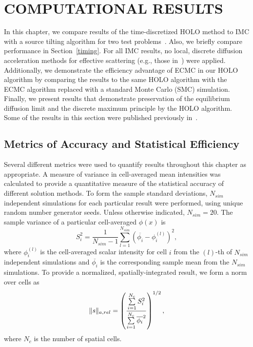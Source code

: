 
\chapter{\uppercase{Computational Results}}
\label{chp:results}

In this chapter, we compare results of the time-discretized HOLO method to IMC with
a source tilting algorithm for two test problems~\cite{jayenne}.  Also, we
briefly compare performance in Section~\ref{timing}.  For all IMC results, no
local, discrete diffusion acceleration methods for effective scattering
(e.g., those in~\cite{imd,ddmc}) were applied.  Additionally, we demonstrate
the efficiency advantage of ECMC in our HOLO algorithm by comparing the results
to the same HOLO algorithm with the ECMC algorithm replaced with a standard
Monte Carlo (SMC) simulation.  Finally, we present results that demonstrate
preservation of the equilibrium diffusion limit and the discrete maximum
principle by the HOLO algorithm.  Some of the results in this section were published
previously in~\cite{bolding_nse}.  

\section{Metrics of Accuracy and Statistical Efficiency}
\label{sec:metrics}

Several different metrics were used to quantify results throughout this chapter as
appropriate.
A measure of variance in cell-averaged mean intensities was
calculated to provide a quantitative measure of the statistical accuracy of different solution
methods.  To form the sample standard deviations, $N_{sim}$ independent simulations for each
particular result were performed, using unique random number generator seeds.  Unless
otherwise indicated, $N_{sim}=20$.
The sample variance of a particular cell-averaged $\phi(x)$ is 
\begin{equation} 
    S_i^2 =  \frac{1}{N_{sim}-1} \sum_{l=1}^{N_{sim}} \left(\overline{\phi_{i}} -
    \phi_{i}^{(l)}\right)^2,
\end{equation}
where $\phi_{i}^{(l)}$ is the cell-averaged scalar intensity for cell $i$ from the ${(l)}$-th of $N_{sim}$ independent simulations and
$\overline{\phi_{i}}$ is the corresponding sample mean from the $N_{sim}$ simulations. To
provide a normalized, spatially-integrated result, we form a norm over cells as 
\begin{equation}
    \ss = \left({\frac{\sum\limits_{i=1}^{N_c}
S_i^2}{\sum\limits_{i=1}^{N_c}\overline{\phi_{i}}^2}}\right)^{1/2},
\end{equation}
where $N_c$ is the number of spatial cells. 

